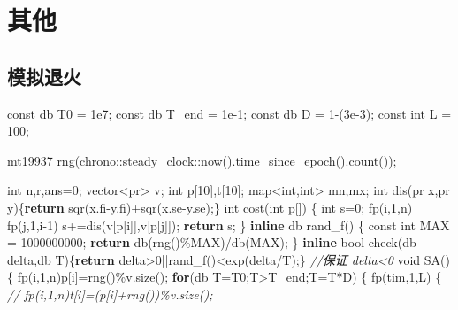 \documentclass[
]{article}
\newenvironment{Shaded}{}{}
\newcommand{\AttributeTok}[1]{\textcolor[rgb]{0.49,0.56,0.16}{#1}}
\newcommand{\CommentTok}[1]{\textcolor[rgb]{0.38,0.63,0.69}{\textit{#1}}}
\newcommand{\ControlFlowTok}[1]{\textcolor[rgb]{0.00,0.44,0.13}{\textbf{#1}}}
\newcommand{\DataTypeTok}[1]{\textcolor[rgb]{0.56,0.13,0.00}{#1}}
\newcommand{\DecValTok}[1]{\textcolor[rgb]{0.25,0.63,0.44}{#1}}
\newcommand{\FloatTok}[1]{\textcolor[rgb]{0.25,0.63,0.44}{#1}}
\newcommand{\KeywordTok}[1]{\textcolor[rgb]{0.00,0.44,0.13}{\textbf{#1}}}
\newcommand{\NormalTok}[1]{#1}
\begin{document}
\hypertarget{ux5176ux4ed6}{%
\section{其他}\label{ux5176ux4ed6}}

\hypertarget{ux6a21ux62dfux9000ux706b}{%
\subsection{模拟退火}\label{ux6a21ux62dfux9000ux706b}}

\begin{Shaded}
\begin{Highlighting}[]
\AttributeTok{const}\NormalTok{ db T0    = }\FloatTok{1e7}\NormalTok{;}
\AttributeTok{const}\NormalTok{ db T\_end = }\FloatTok{1e{-}1}\NormalTok{;}
\AttributeTok{const}\NormalTok{ db D     = }\DecValTok{1}\NormalTok{{-}(}\FloatTok{3e{-}3}\NormalTok{);}
\AttributeTok{const} \DataTypeTok{int}\NormalTok{ L    = }\DecValTok{100}\NormalTok{;}

\NormalTok{mt19937 rng(chrono::steady\_clock::now().time\_since\_epoch().count());}

\DataTypeTok{int}\NormalTok{ n,r,ans=}\DecValTok{0}\NormalTok{;}
\NormalTok{vector\textless{}pr\textgreater{} v;}
\DataTypeTok{int}\NormalTok{ p[}\DecValTok{10}\NormalTok{],t[}\DecValTok{10}\NormalTok{];}
\NormalTok{map\textless{}}\DataTypeTok{int}\NormalTok{,}\DataTypeTok{int}\NormalTok{\textgreater{} mn,mx;}
\DataTypeTok{int}\NormalTok{ dis(pr x,pr y)\{}\ControlFlowTok{return}\NormalTok{ sqr(x.fi{-}y.fi)+sqr(x.se{-}y.se);\}}
\DataTypeTok{int}\NormalTok{ cost(}\DataTypeTok{int}\NormalTok{ p[])}
\NormalTok{\{}
    \DataTypeTok{int}\NormalTok{ s=}\DecValTok{0}\NormalTok{;}
\NormalTok{    fp(i,}\DecValTok{1}\NormalTok{,n)}
\NormalTok{        fp(j,}\DecValTok{1}\NormalTok{,i{-}}\DecValTok{1}\NormalTok{)}
\NormalTok{            s+=dis(v[p[i]],v[p[j]]);}
    \ControlFlowTok{return}\NormalTok{ s;}
\NormalTok{\}}
\KeywordTok{inline}\NormalTok{ db rand\_f()}
\NormalTok{\{}
    \AttributeTok{const} \DataTypeTok{int}\NormalTok{ MAX = }\DecValTok{1000000000}\NormalTok{;}
    \ControlFlowTok{return}\NormalTok{ db(rng()\%MAX)/db(MAX);}
\NormalTok{\}}
\KeywordTok{inline} \DataTypeTok{bool}\NormalTok{ check(db delta,db T)\{}\ControlFlowTok{return}\NormalTok{ delta\textgreater{}}\DecValTok{0}\NormalTok{||rand\_f()\textless{}exp(delta/T);\} }\CommentTok{//保证 delta\textless{}0}
\DataTypeTok{void}\NormalTok{ SA()}
\NormalTok{\{}
\NormalTok{    fp(i,}\DecValTok{1}\NormalTok{,n)p[i]=rng()\%v.size();}
    \ControlFlowTok{for}\NormalTok{(db T=T0;T\textgreater{}T\_end;T=T*D)}
\NormalTok{    \{   }
\NormalTok{        fp(tim,}\DecValTok{1}\NormalTok{,L)}
\NormalTok{        \{}
            \CommentTok{// fp(i,1,n)t[i]=(p[i]+rng())\%v.size();}
            

\end{Highlighting}
\end{Shaded}
\end{document}
